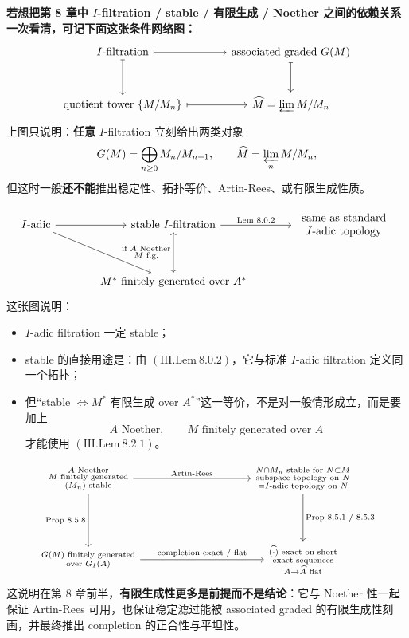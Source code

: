 \documentclass[a4paper]{ctexart}
\theoremstyle{definition}
\theoremstyle{analysis}
\theoremstyle{plain}
\begin{document}
\medskip

\textbf{若想把第 8 章中 \(I\)-filtration / stable / 有限生成 / Noether 之间的依赖关系一次看清，可记下面这张条件网络图：}
\[
\begin{tikzcd}[column sep=large, row sep=large]
\text{\(I\)-filtration} \arrow[r, maps to] \arrow[d, maps to] &
\text{associated graded } G(M) \arrow[d, maps to] \\
\text{quotient tower } \{M/M_n\} \arrow[r, maps to] &
\widehat M=\varprojlim M/M_n
\end{tikzcd}
\]
上图只说明：\textbf{任意} \(I\)-filtration 立刻给出两类对象
\[
  G(M)=\bigoplus_{n\ge 0} M_n/M_{n+1},
  \qquad
  \widehat M=\varprojlim_n M/M_n,
\]
但这时一般\textbf{还不能}推出稳定性、拓扑等价、Artin-Rees、或有限生成性质。

\[
\begin{tikzcd}[column sep=large, row sep=large]
\text{\(I\)-adic} \arrow[r] \arrow[dr] &
\text{stable \(I\)-filtration} \arrow[r, "\text{Lem 8.0.2}"] \arrow[d, leftrightarrow, "\substack{\text{if }A\text{ Noether}\\ M\text{ f.g.}}"'] &
\begin{array}{c}
\text{same as standard}\\
\text{\(I\)-adic topology}
\end{array} \\
&
\text{\(M^*\) finitely generated over \(A^*\)} &
\end{tikzcd}
\]
这张图说明：
\begin{itemize}
  \item \(I\)-adic filtration 一定 stable；
  \item stable 的直接用途是：由 \((\mathrm{III.Lem}\ 8.0.2)\)，它与标准 \(I\)-adic filtration 定义同一个拓扑；
  \item 但“stable \(\Longleftrightarrow M^*\) 有限生成 over \(A^*\)”这一等价，不是对一般情形成立，而是要加上
  \[
    A\text{ Noether},\qquad M\text{ finitely generated over }A
  \]
  才能使用 \((\mathrm{III.Lem}\ 8.2.1)\)。
\end{itemize}

\[
\begin{tikzcd}[column sep=3.5cm, row sep=1.5cm]
\substack{A\text{ Noether}\\ M\text{ finitely generated}\\ (M_n)\text{ stable}}
\arrow[r, "\text{Artin-Rees}"]
\arrow[d, "\text{Prop 8.5.8}"'] &
\substack{N\cap M_n \text{ stable for }N\subset M\\
\text{subspace topology on }N\\
= \text{\(I\)-adic topology on }N}
\arrow[d, "\text{Prop 8.5.1 / 8.5.3}"] \\
\substack{G(M)\text{ finitely generated}\\ \text{over }G_I(A)}
\arrow[r, "\text{completion exact / flat}"] &
\substack{\widehat{(\cdot)}\text{ exact on short}\\ \text{exact sequences}\\ A\to\widehat A\text{ flat}}
\end{tikzcd}
\]
这说明在第 8 章前半，\textbf{有限生成性更多是前提而不是结论}：它与 Noether 性一起保证 Artin-Rees 可用，也保证稳定滤过能被 associated graded 的有限生成性刻画，并最终推出 completion 的正合性与平坦性。
\end{document}
